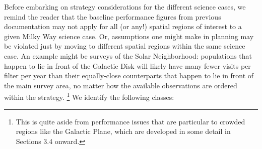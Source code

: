 Before embarking on strategy considerations for the different science
cases, we remind the reader that the baseline performance figures from
previous documentation may not apply for all (or any!) spatial regions
of interest to a given Milky Way science case. Or, assumptions one
might make in planning may be violated just by moving to different
spatial regions within the same science case.  An example might be
surveys of the Solar Neighborhood: populations that happen to
lie in front of the Galactic Disk will likely have many fewer visits
per filter per year than their equally-close counterparts that happen
to lie in front of the main survey area, no matter how the available
observations are ordered within the strategy. \footnote{This is quite
  aside from performance issues that are particular to crowded regions
  like the Galactic Plane, which are developed in some detail in
  Sections 3.4 onward.}  We identify the following classes:
